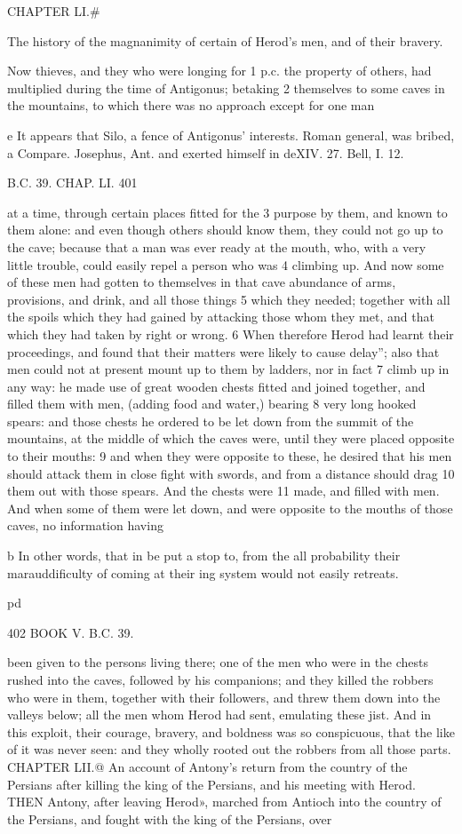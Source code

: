 CHAPTER LI.# 

The history of the magnanimity of certain of Herod's men, and of their bravery. 

Now thieves, and they who were longing for 1 
p.c. the property of others, had multiplied 
during the time of Antigonus; betaking 2 themselves to some caves in the mountains, to which there was no approach except for one man 

e It appears that Silo, a fence of Antigonus’ interests. Roman general, was bribed, a Compare. Josephus, Ant. and exerted himself in deXIV. 27. Bell, I. 12. 

B.C. 39. CHAP. LI. 401 

at a time, through certain places fitted for the 
3 purpose by them, and known to them alone: and even though others should know them, they could not go up to the cave; because that a man was ever ready at the mouth, who, with a very little trouble, could easily repel a person who was 
4 climbing up. And now some of these men had gotten to themselves in that cave abundance of arms, provisions, and drink, and all those things 
5 which they needed; together with all the spoils which they had gained by attacking those whom they met, and that which they had taken by right or wrong. 
6 When therefore Herod had learnt their proceedings, and found that their matters were likely to cause delay”; also that men could not at present mount up to them by ladders, nor in fact 
7 climb up in any way: he made use of great wooden chests fitted and joined together, and filled them with men, (adding food and water,) bearing 
8 very long hooked spears: and those chests he ordered to be let down from the summit of the mountains, at the middle of which the caves were, until they were placed opposite to their mouths: 
9 and when they were opposite to these, he desired that his men should attack them in close fight with swords, and from a distance should drag 
10 them out with those spears. And the chests were 11 made, and filled with men. And when some of them were let down, and were opposite to the mouths of those caves, no information having 

b In other words, that in be put a stop to, from the all probability their marauddificulty of coming at their ing system would not easily retreats. 

pd 

402 BOOK V. B.C. 39. 

been given to the persons living there; one of the 
men who were in the chests rushed into the caves, 
followed by his companions; and they killed the robbers who were in them, together with their followers, and threw them down into the valleys below; all the men whom Herod had sent, emulating these jist. And in this exploit, their courage, bravery, and boldness was so conspicuous, that the like of it was never seen: and they wholly rooted out the robbers from all those parts. 
CHAPTER LII.@ 
An account of Antony's return from the country of the Persians after killing the king of the Persians, and his meeting with Herod. 
THEN Antony, after leaving Herod», marched from Antioch into the country of the Persians, and fought with the king of the Persians, over


